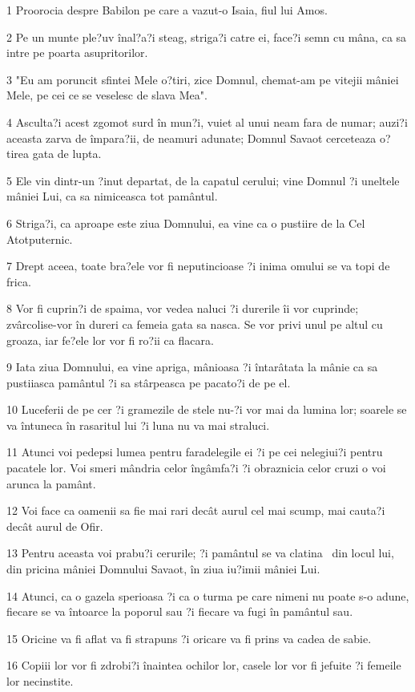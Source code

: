 \par 1 Proorocia despre Babilon pe care a vazut-o Isaia, fiul lui Amos.
\par 2 Pe un munte ple?uv înal?a?i steag, striga?i catre ei, face?i semn cu mâna, ca sa intre pe poarta asupritorilor.
\par 3 "Eu am poruncit sfintei Mele o?tiri, zice Domnul, chemat-am pe vitejii mâniei Mele, pe cei ce se veselesc de slava Mea".
\par 4 Asculta?i acest zgomot surd în mun?i, vuiet al unui neam fara de numar; auzi?i aceasta zarva de împara?ii, de neamuri adunate; Domnul Savaot cerceteaza o?tirea gata de lupta.
\par 5 Ele vin dintr-un ?inut departat, de la capatul cerului; vine Domnul ?i uneltele mâniei Lui, ca sa nimiceasca tot pamântul.
\par 6 Striga?i, ca aproape este ziua Domnului, ea vine ca o pustiire de la Cel Atotputernic.
\par 7 Drept aceea, toate bra?ele vor fi neputincioase ?i inima omului se va topi de frica.
\par 8 Vor fi cuprin?i de spaima, vor vedea naluci ?i durerile îi vor cuprinde; zvârcolise-vor în dureri ca femeia gata sa nasca. Se vor privi unul pe altul cu groaza, iar fe?ele lor vor fi ro?ii ca flacara.
\par 9 Iata ziua Domnului, ea vine apriga, mânioasa ?i întarâtata la mânie ca sa pustiiasca pamântul ?i sa stârpeasca pe pacato?i de pe el.
\par 10 Luceferii de pe cer ?i gramezile de stele nu-?i vor mai da lumina lor; soarele se va întuneca în rasaritul lui ?i luna nu va mai straluci.
\par 11 Atunci voi pedepsi lumea pentru faradelegile ei ?i pe cei nelegiui?i pentru pacatele lor. Voi smeri mândria celor îngâmfa?i ?i obraznicia celor cruzi o voi arunca la pamânt.
\par 12 Voi face ca oamenii sa fie mai rari decât aurul cel mai scump, mai cauta?i decât aurul de Ofir.
\par 13 Pentru aceasta voi prabu?i cerurile; ?i pamântul se va clatina  din locul lui, din pricina mâniei Domnului Savaot, în ziua iu?imii mâniei Lui.
\par 14 Atunci, ca o gazela sperioasa ?i ca o turma pe care nimeni nu poate s-o adune, fiecare se va întoarce la poporul sau ?i fiecare va fugi în pamântul sau.
\par 15 Oricine va fi aflat va fi strapuns ?i oricare va fi prins va cadea de sabie.
\par 16 Copiii lor vor fi zdrobi?i înaintea ochilor lor, casele lor vor fi jefuite ?i femeile lor necinstite.
